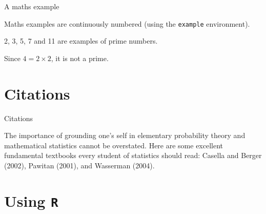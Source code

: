 \documentclass[,]{beamer}
\begin{document}
\begin{frame}{A maths example}
\protect\hypertarget{a-maths-example}{}

Maths examples are continuously numbered (using the \texttt{example}
environment).

\begin{example}
    2, 3, 5, 7 and 11 are examples of prime numbers.
\end{example}

\begin{example}
    Since $4 = 2 \times 2$, it is not a prime.
\end{example}

\end{frame}

\hypertarget{citations}{%
\section{Citations}\label{citations}}

\begin{frame}{Citations}
\protect\hypertarget{citations-1}{}

The importance of grounding one's self in elementary probability theory
and mathematical statistics cannot be overstated. Here are some
excellent fundamental textbooks every student of statistics should read:
Casella and Berger (2002), Pawitan (2001), and Wasserman (2004).


\end{frame}

\hypertarget{using-r}{%
\section{\texorpdfstring{Using \texttt{R}}{Using R}}\label{using-r}}
\end{document}
